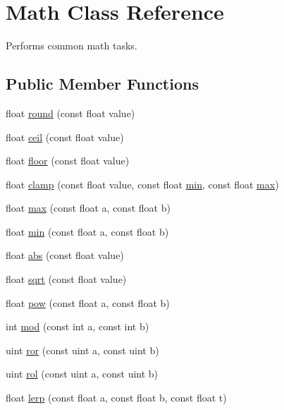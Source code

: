 \hypertarget{class_math}{\section{Math Class Reference}
\label{class_math}
}


Performs common math tasks.  


\subsection*{Public Member Functions}
\begin{DoxyCompactItemize}
\item 
float \hyperlink{class_math_a0067f69c9af6ba8037855572fc628868}{round} (const float value)
\item 
float \hyperlink{class_math_addc8b7a243dc72f8e99f665acd9ae049}{ceil} (const float value)
\item 
float \hyperlink{class_math_abdb499fa2909a14f74f4311958108a16}{floor} (const float value)
\item 
float \hyperlink{class_math_a0a7320f8b234158fae0d97a823145e33}{clamp} (const float value, const float \hyperlink{class_math_a5496cc5ea15ad4aac8787dff54935f61}{min}, const float \hyperlink{class_math_a9b8ddb72bdde656da72d6cc2b3208499}{max})
\item 
float \hyperlink{class_math_a9b8ddb72bdde656da72d6cc2b3208499}{max} (const float a, const float b)
\item 
float \hyperlink{class_math_a5496cc5ea15ad4aac8787dff54935f61}{min} (const float a, const float b)
\item 
float \hyperlink{class_math_a3c55041c8264e92c676de666b7c983a0}{abs} (const float value)
\item 
float \hyperlink{class_math_a7188144b1cf878987b9924b48e59a557}{sqrt} (const float value)
\item 
float \hyperlink{class_math_a0178eda0ae56e84df2c1929863a07837}{pow} (const float a, const float b)
\item 
int \hyperlink{class_math_a2fc083b5f0e05d3ae517746aec624206}{mod} (const int a, const int b)
\item 
uint \hyperlink{class_math_aea730551885a893809bcdcc42ab65eab}{ror} (const uint a, const uint b)
\item 
uint \hyperlink{class_math_af41b8fcc9b329f57f0478873633c9f08}{rol} (const uint a, const uint b)
\item 
float \hyperlink{class_math_a1d0e7c57c4199d0041db174ed8cc2f94}{lerp} (const float a, const float b, const float t)

\end{DoxyCompactItemize}

